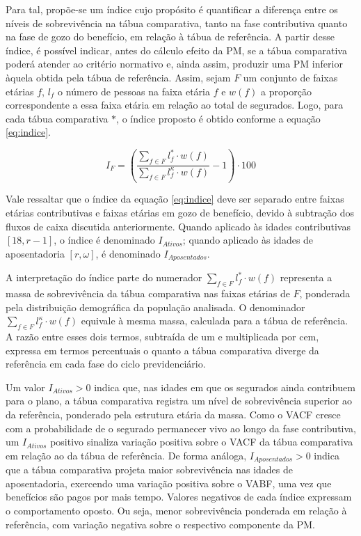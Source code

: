 Para tal, propõe-se um índice cujo propósito é quantificar a diferença entre os níveis de sobrevivência na tábua comparativa, tanto na fase contributiva quanto na fase de gozo do benefício, em relação à tábua de referência. A partir desse índice, é possível indicar, antes do cálculo efeito da PM, se a tábua comparativa poderá atender ao critério normativo e, ainda assim, produzir uma PM inferior àquela obtida pela tábua de referência. Assim, sejam $F$ um conjunto de faixas etárias $f$, $l_f$ o número de pessoas na faixa etária $f$ e $w(f)$ a proporção correspondente a essa faixa etária em relação ao total de segurados. Logo, para cada tábua comparativa $*$, o índice proposto é obtido conforme a equação \ref{eq:indice}.

\begin{equation}
    I_F = \left(\frac{\sum_{f \in F}{} l^{*}_{f} \cdot w(f)}{\sum_{f \in F}{} l^{\kappa}_{f} \cdot w(f)} - 1 \right) \cdot 100
    \label{eq:indice}
\end{equation}

Vale ressaltar que o índice da equação \ref{eq:indice} deve ser separado entre faixas etárias contributivas e faixas etárias em gozo de benefício, devido à subtração dos fluxos de caixa discutida anteriormente. Quando aplicado às idades contributivas $[18, r-1]$, o índice é denominado $I_{Ativos}$; quando aplicado às idades de aposentadoria $[r, \omega]$, é denominado $I_{Aposentados}$.

A interpretação do índice parte do numerador $\sum_{f \in F} l^{*}_{f} \cdot w(f)$ representa a massa de sobrevivência da tábua comparativa nas faixas etárias de $F$, ponderada pela distribuição demográfica da população analisada. O denominador $\sum_{f \in F} l^{\kappa}_{f} \cdot w(f)$ equivale à mesma massa, calculada para a tábua de referência. A razão entre esses dois termos, subtraída de um e multiplicada por cem, expressa em termos percentuais o quanto a tábua comparativa diverge da referência em cada fase do ciclo previdenciário.

Um valor $I_{Ativos} > 0$ indica que, nas idades em que os segurados ainda contribuem para o plano, a tábua comparativa registra um nível de sobrevivência superior ao da referência, ponderado pela estrutura etária da massa. Como o VACF cresce com a probabilidade de o segurado permanecer vivo ao longo da fase contributiva, um $I_{Ativos}$ positivo sinaliza variação positiva sobre o VACF da tábua comparativa em relação ao da tábua de referência. De forma análoga, $I_{Aposentados} > 0$ indica que a tábua comparativa projeta maior sobrevivência nas idades de aposentadoria, exercendo uma variação positiva sobre o VABF, uma vez que benefícios são pagos por mais tempo. Valores negativos de cada índice expressam o comportamento oposto. Ou seja, menor sobrevivência ponderada em relação à referência, com variação negativa sobre o respectivo componente da PM.

